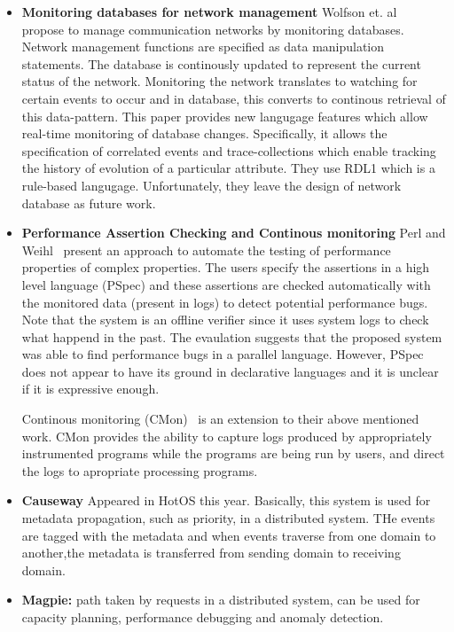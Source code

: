 \documentclass{sig-alt-full}
\begin{document}
{\begin{itemize}
\item{\bf Monitoring databases for network management} Wolfson et. al~\cite{wolfson-ieee91} 
propose to manage communication networks by monitoring databases. Network 
management functions are specified as data manipulation statements. The 
database is continously updated to represent the current status of the network. 
Monitoring the network translates to watching for certain events to occur and 
in database, this converts to continous retrieval of this data-pattern. This 
paper provides new langugage features which allow real-time monitoring of 
database changes. Specifically, it allows the specification of correlated 
events and trace-collections which enable tracking the history of evolution 
of a particular attribute. They use RDL1 which is a rule-based langugage. 
Unfortunately, they leave the design of network database as future work.

\item{\bf Performance Assertion Checking and Continous monitoring} 
Perl and Weihl~\cite{perl-sosp93short} present an approach to automate the 
testing of performance properties of complex properties. The users 
specify the assertions in a high level language (PSpec) and these 
assertions are checked automatically with the monitored data (present in logs) 
to detect potential performance bugs. Note that the system is an offline 
verifier since it uses system logs to check what happend in the past. The 
evaulation suggests that the proposed system was able to find performance 
bugs in a parallel language. However, PSpec does not appear to have its 
ground in declarative languages and it is unclear if it is expressive enough.

Continous monitoring (CMon)~\cite{perl-cmon} is an extension to their 
above mentioned work. CMon provides the ability to capture logs produced 
by appropriately instrumented programs while the programs are being run 
by users, and direct the logs to apropriate processing programs.

\item{\bf Causeway} Appeared in HotOS this year. Basically, this system is 
used for metadata propagation, such as priority, in a distributed system. 
THe events are tagged with the metadata and when events traverse from one 
domain to another,the metadata is transferred from sending domain to receiving domain.


\item{\bf Magpie:} path taken by requests in a distributed system, can 
be used for capacity planning, performance debugging and anomaly detection.



\end{itemize}}
\end{document}
